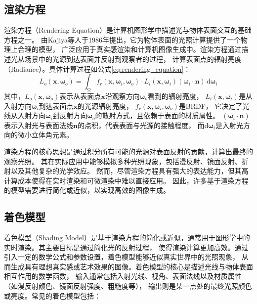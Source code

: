 \subsection{渲染方程}
渲染方程（Rendering Equation）是计算机图形学中描述光与物体表面交互的基础方程之一。
由Kajiya等人于1986年提出\cite{Kajiya_1986}，它为物体表面的光照计算提供了一个物理上合理的模型，
广泛应用于真实感渲染和计算机图像生成中。渲染方程通过描述光从场景中的光源到达表面并反射到观察者的过程，
计算表面点的辐射亮度（Radiance）。具体计算过程如公式\eqref{eq:rendering_equation}：
\begin{equation}
  \label{eq:rendering_equation}
  L_o\left({\boldsymbol{x}},{\boldsymbol{\omega}}_o\right)=\int_{\upOmega}f_r\left({\boldsymbol{x}},{\boldsymbol{\omega}}_i,{\boldsymbol{\omega}}_o\right)\cdot L_i\left({\boldsymbol{x}},
  {\boldsymbol{\omega}}_i\right)\left({\boldsymbol{\omega}}_i\cdot\boldsymbol{n}\right)\,\mathrm{d}{\boldsymbol{\omega}}_i
\end{equation}
其中，$L_o\left({\boldsymbol{x}},{\boldsymbol{\omega}}_o\right)$表示从表面点$\boldsymbol{x}$沿观察方向${\boldsymbol{\omega}}_o$看到的辐射亮度，
$L_i\left({\boldsymbol{x}},{\boldsymbol{\omega}}_i\right)$是从入射方向${\boldsymbol{\omega}}_i$到达表面点$\boldsymbol{x}$的光源辐射亮度，
$f_r\left({\boldsymbol{x}},{\boldsymbol{\omega}}_i,{\boldsymbol{\omega}}_o\right)$是BRDF，
它决定了光线从入射方向${\boldsymbol{\omega}}_i$到反射方向${\boldsymbol{\omega}}_o$的散射方式，且依赖于表面的材质属性。
$\left({\boldsymbol{\omega}}_i\cdot\boldsymbol{n}\right)$表示入射光与表面法线$\boldsymbol{n}$的点积，代表表面与光源的接触程度，
而$\mathrm{d}{\boldsymbol{\omega}}_i$是入射光方向的微小立体角元素。

渲染方程的核心思想是通过积分所有可能的光源对表面反射的贡献，计算出最终的观察光照。
其在实际应用中能够模拟多种光照现象，包括漫反射、镜面反射、折射以及其他复杂的光学效应。
然而，尽管渲染方程具有强大的表达能力，但其高计算成本使得在实时渲染和可微渲染中难以直接应用。
因此，许多基于渲染方程的模型需要进行简化或近似，以实现高效的图像生成。

\subsection{着色模型}

着色模型（Shading Model）是基于渲染方程的简化或近似，通常用于图形学中的实时渲染。其主要目标是通过简化光的反射过程，
使得渲染计算更加高效。通过引入一定的数学公式和参数设置，着色模型能够近似真实世界中的光照现象，
从而生成具有理想真实感或艺术效果的图像。着色模型的核心是描述光线与物体表面相互作用的数学函数，
输入通常包括入射光线、视角、表面法线以及材质属性（如漫反射颜色、镜面反射强度、粗糙度等），
输出则是某一点处的最终光照颜色或亮度。常见的着色模型包括：

